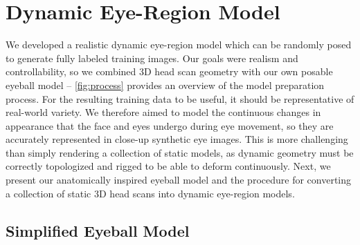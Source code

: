 


\section{Dynamic Eye-Region Model}

We developed a realistic dynamic eye-region model which can be randomly posed to generate fully labeled training images.
Our goals were realism and controllability, so we combined 3D head scan geometry with our own posable eyeball model -- \autoref{fig:process} provides an overview of the model preparation process.
For the resulting training data to be useful, it should be representative of real-world variety.
We therefore aimed to model the continuous changes in appearance that the face and eyes undergo during eye movement, so they are accurately represented in close-up synthetic eye images.
This is more challenging than simply rendering a collection of static models, as dynamic geometry must be correctly topologized and rigged to be able to deform continuously.
%
Next, we present our anatomically inspired eyeball model and the procedure for converting a collection of static 3D head scans into dynamic eye-region models.


\subsection{Simplified Eyeball Model}
\label{subsec:eyeball_model}

